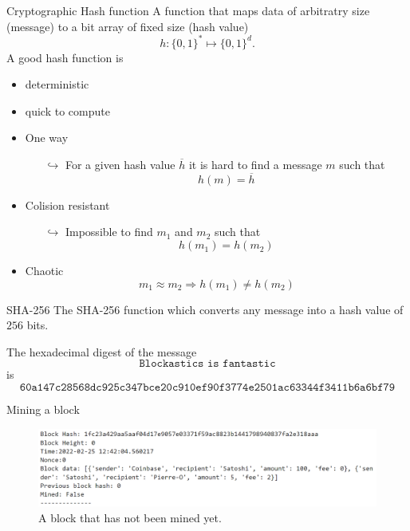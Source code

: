 \documentclass{beamer}
\begin{document}
\begin{frame}{Cryptographic Hash function}
\small
A function that maps data of arbitratry size (message) to a bit array of fixed size (hash value)
$$
h:\{0,1\}^\ast\mapsto \{0,1\}^d. 
$$
A good hash function is
\begin{itemize}
\item deterministic
\item quick to compute
\item One way
\begin{itemize}
  \scriptsize
\item[$\hookrightarrow$] For a given hash value $\overline{h}$ it is hard to find a message $m$ such that 
$$
h(m) = \overline{h}
$$
\end{itemize}
\item Colision resistant 
\begin{itemize}
\item[$\hookrightarrow$] Impossible to find $m_1$ and $m_2$ such that 
$$
h(m_1) = h(m_2)
$$
\end{itemize}
\item Chaotic
$$m_1\approx m_2\Rightarrow  h(m_1) \neq h(m_2)$$
\end{itemize}
\end{frame}
\begin{frame}{SHA-256}
The SHA-256 function which converts any message into a hash value of $256$ bits.
\begin{tcolorbox}[enhanced,drop shadow, title=Example]
The hexadecimal digest of the message
$$
\texttt{Blockastics is fantastic}
$$
is 
\footnotesize
$$
\texttt{60a147c28568dc925c347bce20c910ef90f3774e2501ac63344f3411b6a6bf79}
$$
\end{tcolorbox}
\end{frame}
\begin{frame}{Mining a block}
\begin{figure}[!ht]
    \includegraphics[width = \textwidth]{../../Figures/block_not_mined.png}
    \captionsetup{width=0.8\textwidth}
    \centering
    \caption{A block that has not been mined yet.}
    \label{fig:block_not_mined}
\end{figure}
\end{frame}
\end{document}
